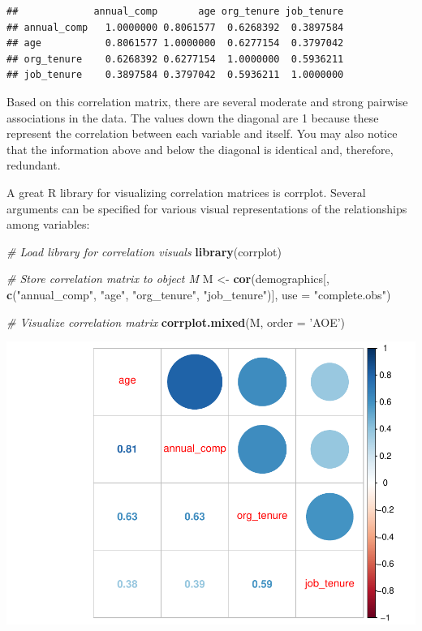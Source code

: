 \documentclass[]{book}
\newenvironment{Shaded}{\begin{snugshade}}{\end{snugshade}}
\newcommand{\CommentTok}[1]{\textcolor[rgb]{0.56,0.35,0.01}{\textit{#1}}}
\newcommand{\DataTypeTok}[1]{\textcolor[rgb]{0.13,0.29,0.53}{#1}}
\newcommand{\KeywordTok}[1]{\textcolor[rgb]{0.13,0.29,0.53}{\textbf{#1}}}
\newcommand{\NormalTok}[1]{#1}
\newcommand{\StringTok}[1]{\textcolor[rgb]{0.31,0.60,0.02}{#1}}
\begin{document}
\begin{verbatim}
##             annual_comp       age org_tenure job_tenure
## annual_comp   1.0000000 0.8061577  0.6268392  0.3897584
## age           0.8061577 1.0000000  0.6277154  0.3797042
## org_tenure    0.6268392 0.6277154  1.0000000  0.5936211
## job_tenure    0.3897584 0.3797042  0.5936211  1.0000000
\end{verbatim}

Based on this correlation matrix, there are several moderate and strong pairwise associations in the data. The values down the diagonal are 1 because these represent the correlation between each variable and itself. You may also notice that the information above and below the diagonal is identical and, therefore, redundant.

A great R library for visualizing correlation matrices is corrplot. Several arguments can be specified for various visual representations of the relationships among variables:

\begin{Shaded}
\begin{Highlighting}[]
\CommentTok{# Load library for correlation visuals}
\KeywordTok{library}\NormalTok{(corrplot)}

\CommentTok{# Store correlation matrix to object M}
\NormalTok{M <-}\StringTok{ }\KeywordTok{cor}\NormalTok{(demographics[, }\KeywordTok{c}\NormalTok{(}\StringTok{"annual_comp"}\NormalTok{, }\StringTok{"age"}\NormalTok{, }\StringTok{"org_tenure"}\NormalTok{, }\StringTok{"job_tenure"}\NormalTok{)], }\DataTypeTok{use =} \StringTok{"complete.obs"}\NormalTok{)}

\CommentTok{# Visualize correlation matrix}
\KeywordTok{corrplot.mixed}\NormalTok{(M, }\DataTypeTok{order =} \StringTok{'AOE'}\NormalTok{)}
\end{Highlighting}
\end{Shaded}

\includegraphics{_main_files/figure-latex/unnamed-chunk-27-1.pdf}
\end{document}
